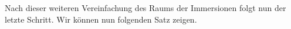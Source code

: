 Nach dieser weiteren Vereinfachung des Raums der Immersionen folgt
nun der letzte Schritt. Wir können nun folgenden Satz zeigen.



%
%
%
%
%
%
%
